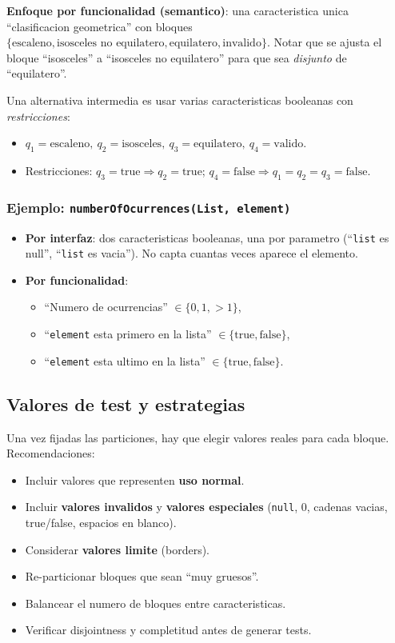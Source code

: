 \documentclass[12pt,a4paper]{article}
\begin{document}
\textbf{Enfoque por funcionalidad (semantico)}: una caracteristica unica ``clasificacion
geometrica'' con bloques \(\{\text{escaleno}, \text{isosceles no equilatero}, \text{equilatero},
\text{invalido}\}\). Notar que se ajusta el bloque ``isosceles'' a ``isosceles no equilatero''
para que sea \emph{disjunto} de ``equilatero''.

Una alternativa intermedia es usar varias caracteristicas booleanas con \emph{restricciones}:
\begin{itemize}
  \item \(q_1 = \text{escaleno},\ q_2 = \text{isosceles},\ q_3 = \text{equilatero},\ q_4 = \text{valido}\).
  \item Restricciones: \(q_3 = \text{true} \Rightarrow q_2 = \text{true}\);
  \(q_4 = \text{false} \Rightarrow q_1 = q_2 = q_3 = \text{false}\).
\end{itemize}

\subsubsection{Ejemplo: \texttt{numberOfOcurrences(List, element)}}

\begin{itemize}
  \item \textbf{Por interfaz}: dos caracteristicas booleanas, una por parametro (``\texttt{list}
  es null'', ``\texttt{list} es vacia''). No capta cuantas veces aparece el elemento.
  \item \textbf{Por funcionalidad}:
  \begin{itemize}
    \item ``Numero de ocurrencias'' \(\in \{0, 1, >1\}\),
    \item ``\texttt{element} esta primero en la lista'' \(\in \{\text{true},\text{false}\}\),
    \item ``\texttt{element} esta ultimo en la lista'' \(\in \{\text{true},\text{false}\}\).
  \end{itemize}
\end{itemize}

\subsection{Valores de test y estrategias}

Una vez fijadas las particiones, hay que elegir valores reales para cada bloque. Recomendaciones:

\begin{itemize}
  \item Incluir valores que representen \textbf{uso normal}.
  \item Incluir \textbf{valores invalidos} y \textbf{valores especiales} (\texttt{null}, 0, cadenas
  vacias, true/false, espacios en blanco).
  \item Considerar \textbf{valores limite} (borders).
  \item Re-particionar bloques que sean ``muy gruesos''.
  \item Balancear el numero de bloques entre caracteristicas.
  \item Verificar disjointness y completitud antes de generar tests.
\end{itemize}
\end{document}
